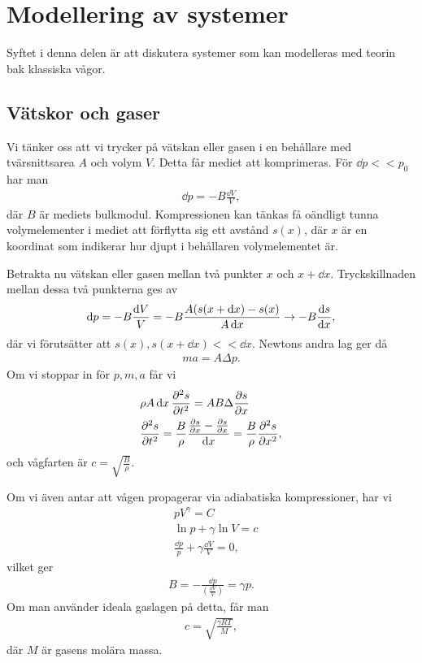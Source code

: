 \section{Modellering av systemer}
Syftet i denna delen är att diskutera systemer som kan modelleras med teorin bak klassiska vågor.

\subsection{Vätskor och gaser}
Vi tänker oss att vi trycker på vätskan eller gasen i en behållare med tvärsnittsarea $A$ och volym $V$. Detta får mediet att komprimeras. För $\dd{p} << p_0$ har man
\begin{align*}
	\dd{p} = -B\frac{\dd{V}}{V},
\end{align*}
där $B$ är mediets bulkmodul. Kompressionen kan tänkas få oändligt tunna volymelementer i mediet att förflytta sig ett avstånd $s(x)$, där $x$ är en koordinat som indikerar hur djupt i behållaren volymelementet är.

Betrakta nu vätskan eller gasen mellan två punkter $x$ och $x + \dd{x}$. Tryckskillnaden mellan dessa två punkterna ges av
\begin{align*}
	\dd{p} = -B\frac{\dd{V}}{V} = -B\frac{A(s(x + \dd{x}) - s(x)}{A\dd{x}}\to -B\dv{s}{x},
\end{align*}
där vi förutsätter att $s(x), s(x + \dd{x}) << \dd{x}$. Newtons andra lag ger då
\begin{align*}
	ma = A\Delta p. 
\end{align*}
Om vi stoppar in för $p, m, a$ får vi
\begin{align*}
	&\rho A\dd{x}\pdv[2]{s}{t} = AB\Delta\pdv{s}{x} \\
	&\pdv[2]{s}{t} = \frac{B}{\rho}\frac{\pdv{s}{x}(x + \dd{x}) - \pdv{s}{x}(x)}{\dd{x}} = \frac{B}{\rho}\pdv[2]{s}{x},
\end{align*}
och vågfarten är $c = \sqrt{\frac{B}{\rho}}$.

Om vi även antar att vågen propagerar via adiabatiska kompressioner, har vi
\begin{align*}
	&pV^{\gamma} = C \\
	&\ln{p} + \gamma\ln{V} = c \\
	&\frac{\dd{p}}{p} + \gamma\frac{\dd{V}}{V} = 0,
\end{align*}
vilket ger
\begin{align*}
	B = -\frac{\dd{p}}{\left(\frac{\dd{V}}{V}\right)} = \gamma p.
\end{align*}
Om man använder ideala gaslagen på detta, får man
\begin{align*}
	c = \sqrt{\frac{\gamma RT}{M}},
\end{align*}
där $M$ är gasens molära massa.

